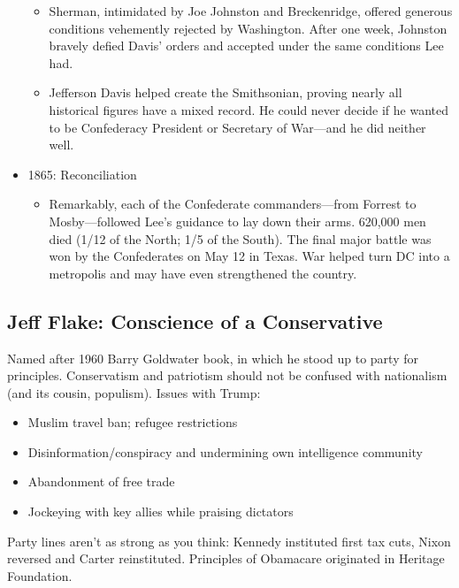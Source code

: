 \documentclass[
]{article}
\providecommand{\tightlist}{%
  \setlength{\itemsep}{0pt}\setlength{\parskip}{0pt}}
\begin{document}
\begin{itemize}
  \begin{itemize}
  \item
    Sherman, intimidated by Joe Johnston and Breckenridge, offered
    generous conditions vehemently rejected by Washington. After one
    week, Johnston bravely defied Davis' orders and accepted under the
    same conditions Lee had.
  \item
    Jefferson Davis helped create the Smithsonian, proving nearly all
    historical figures have a mixed record. He could never decide if he
    wanted to be Confederacy President or Secretary of War---and he did
    neither well.
  \end{itemize}
\item
  1865: Reconciliation

  \begin{itemize}
  \tightlist
  \item
    Remarkably, each of the Confederate commanders---from Forrest to
    Mosby---followed Lee's guidance to lay down their arms. 620,000 men
    died (1/12 of the North; 1/5 of the South). The final major battle
    was won by the Confederates on May 12 in Texas. War helped turn DC
    into a metropolis and may have even strengthened the country.
  \end{itemize}
\end{itemize}

\hypertarget{jeff-flake-conscience-of-a-conservative}{%
\subsection{Jeff Flake: Conscience of a
Conservative}\label{jeff-flake-conscience-of-a-conservative}}

Named after 1960 Barry Goldwater book, in which he stood up to party for
principles. Conservatism and patriotism should not be confused with
nationalism (and its cousin, populism). Issues with Trump:

\begin{itemize}
\item
  Muslim travel ban; refugee restrictions
\item
  Disinformation/conspiracy and undermining own intelligence community
\item
  Abandonment of free trade
\item
  Jockeying with key allies while praising dictators
\end{itemize}

Party lines aren't as strong as you think: Kennedy instituted first tax
cuts, Nixon reversed and Carter reinstituted. Principles of Obamacare
originated in Heritage Foundation.
\end{document}

